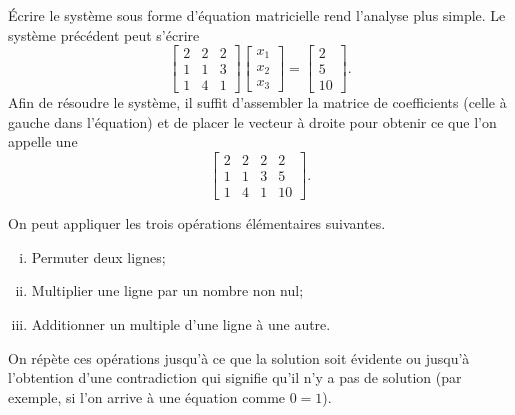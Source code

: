 Écrire le système sous forme d’équation matricielle rend l'analyse plus simple. Le système précédent peut s’écrire
\begin{equation*}
\begin{bmatrix}
2 & 2 & 2 \\
1 & 1 & 3 \\
1 & 4 & 1 
\end{bmatrix}
\begin{bmatrix}
x_1 \\
x_2 \\
x_3
\end{bmatrix} 
=
\begin{bmatrix}
2 \\
5 \\
10
\end{bmatrix} .
\end{equation*}
Afin de résoudre le système, il suffit d’assembler la matrice de coefficients (celle à gauche dans l’équation) et de placer le vecteur à droite pour obtenir ce que l’on appelle une
\emph{}
\begin{equation*}
\left[
\begin{array}{ccc|c}
2 & 2 & 2 & 2 \\
1 & 1 & 3 & 5 \\
1 & 4 & 1 & 10
\end{array}
\right] .
\end{equation*}

\pagebreak[2]
On peut appliquer les trois opérations élémentaires suivantes.
\begin{enumerate}[(i)]
\item Permuter deux lignes;
\item Multiplier une ligne par un nombre non nul;
\item Additionner un multiple d’une ligne à une autre.
\end{enumerate}
On répète ces opérations jusqu'à ce que la solution soit évidente ou jusqu’à l’obtention d’une contradiction qui signifie qu’il n’y a pas de solution (par exemple, si l'on arrive à une équation comme $0=1$).

